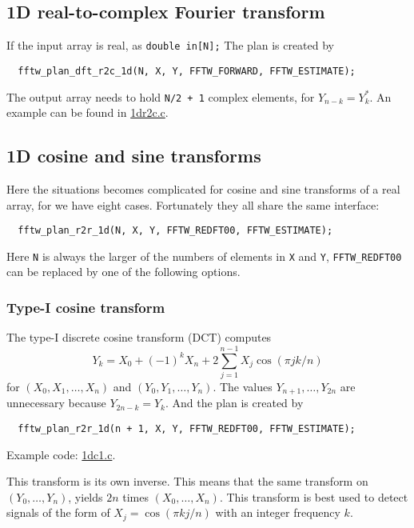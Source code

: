 \documentclass[12pt]{article}
\begin{document}
\subsection{1D real-to-complex Fourier transform}

If the input array is real, as \texttt{double in[N];}
%
The plan is created by
\begin{verbatim}
  fftw_plan_dft_r2c_1d(N, X, Y, FFTW_FORWARD, FFTW_ESTIMATE);
\end{verbatim}
%
The output array needs to hold \texttt{N/2 + 1} complex elements,
for $Y_{n - k} = Y_k^*$.
%
An example can be found in \url{1dr2c.c}.




\subsection{1D cosine and sine transforms}

Here the situations becomes complicated for cosine and sine transforms of
  a real array, for we have eight cases.
%
Fortunately they all share the same interface:
\begin{verbatim}
  fftw_plan_r2r_1d(N, X, Y, FFTW_REDFT00, FFTW_ESTIMATE);
\end{verbatim}
Here \texttt{N} is always the larger of
  the numbers of elements in \texttt{X} and \texttt{Y},
\texttt{FFTW\_REDFT00} can be replaced by one of the following options.





\subsubsection{Type-I cosine transform}
The type-I discrete cosine transform (DCT) computes
\begin{equation}
  Y_k = X_0 + (-1)^k X_{n}
  + 2 \sum_{j = 1}^{n - 1} X_j \cos(\pi j k / n)
\end{equation}
for $(X_0, X_1, \dots, X_n)$ and $(Y_0, Y_1, \dots, Y_n)$.
%
The values $Y_{n+1}, \dots, Y_{2n}$ are unnecessary because $Y_{2n - k} = Y_k$.
%
And the plan is created by
\begin{verbatim}
  fftw_plan_r2r_1d(n + 1, X, Y, FFTW_REDFT00, FFTW_ESTIMATE);
\end{verbatim}
Example code: \url{1dc1.c}.

This transform is its own inverse.
%
This means that the same transform on $(Y_0, \dots, Y_n)$,
  yields $2n$ times $(X_0, \dots, X_n)$.
%
This transform is best used to detect signals of the form of
  $X_j = \cos(\pi k j/n)$
  with an integer frequency $k$.
\end{document}
